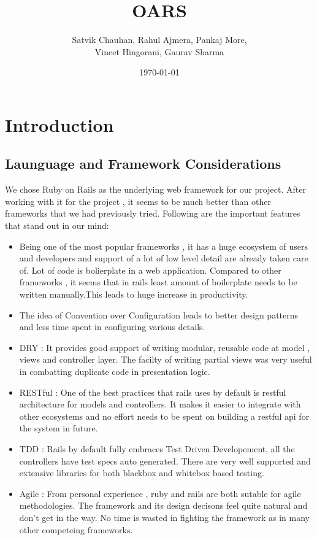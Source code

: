 \documentclass[12pt]{article}
\title{OARS}
\author{Satvik Chauhan, Rahul Ajmera, Pankaj More, \\ Vineet Hingorani, Gaurav
  Sharma}
\date{{\small \today}}
\begin{document}
\maketitle
\section{Introduction}
\subsection{Launguage and Framework Considerations}

We chose Ruby on Rails as the underlying web framework for our
project. After working with it for the project , it seems to be much
better than other frameworks that we had previously tried. Following
are the important features that stand out in our mind:
\begin{itemize}
\item Being one of the most popular frameworks , it has a huge
  ecosystem of users and developers and support of a lot of low level
  detail are already taken care of. Lot of code is bolierplate in a
  web application. Compared to other frameworks , it seems that in
  rails least amount of boilerplate needs to be written manually.This
  leads to huge increase in productivity.
\item The idea of Convention over Configuration leads to better design
  patterns and less time spent in configuring various details.
\item DRY : It provides good support of writing modular, reusable code
  at model , views and controller layer. The facilty of writing
  partial views was very useful in combatting duplicate code in
  presentation logic.
\item RESTful : One of the best practices that rails uses by default
  is restful architecture for models and controllers. It makes it
  easier to integrate with other ecosystems and no effort needs to be
  spent on building a restful api for the system in future.
\item TDD : Rails by default fully embraces Test Driven Developement,
  all the controllers have test specs auto generated. There are very
  well supported and extensive libraries for both blackbox and
  whitebox based testing.
\item Agile : From personal experience , ruby and rails are both
  sutable for agile methodologies. The framework and its design
  decisons feel quite natural and don't get in the way. No time is
  wasted in fighting the framework as in many other competeing
  frameworks.
\end{itemize}
\end{document}
